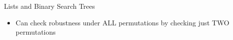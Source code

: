 \documentclass[usenames,dvipsnames]{beamer}
\newcommand{\e}{\emptyset}
\begin{document}
\begin{frame}[fragile]{Lists and Binary Search Trees}
  \begin{itemize}
    \item Can check robustness under ALL permutations 
      by checking just TWO permutations
  \end{itemize}

\end{frame}

% 
\end{document}
